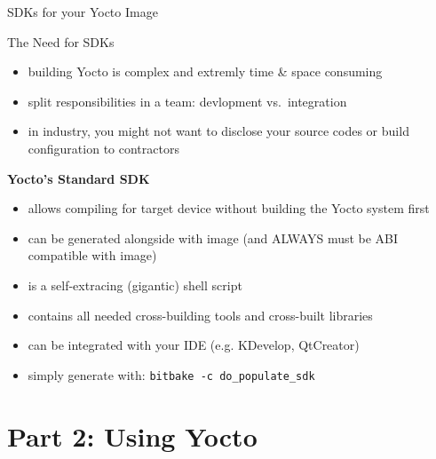 \documentclass[ucs,9pt]{beamer}
\begin{document}
\begin{frame}
    {SDKs for your Yocto Image}

    \begin{block}{The Need for SDKs}
    \begin{itemize}
        \item building Yocto is complex and extremly time \& space consuming
        \item split responsibilities in a team: devlopment vs.\ integration
        \item in industry, you might not want to disclose your source codes or build configuration to contractors
    \end{itemize}
    \end{block}
    \smallskip
    \par
    \textbf{Yocto's Standard SDK}
    \begin{itemize}
        \item allows compiling for target device without building the Yocto system first
        \item can be generated alongside with image (and ALWAYS must be ABI compatible with image)
        \item is a self-extracing (gigantic) shell script
        \item contains all needed cross-building tools and cross-built libraries
        \item can be integrated with your IDE (e.g. KDevelop, QtCreator)
        \item simply generate with: \texttt{bitbake -c do\_populate\_sdk}
    \end{itemize}
\end{frame}

\section{Part 2: Using Yocto}
\end{document}
